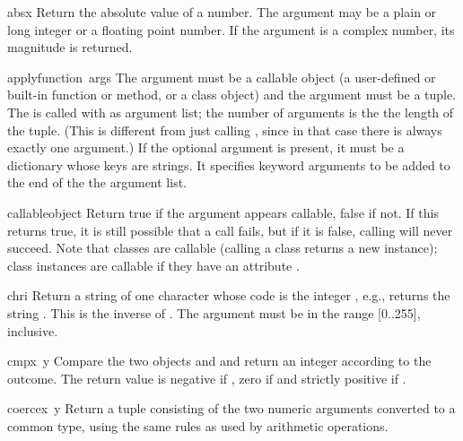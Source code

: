 \begin{funcdesc}{abs}{x}
  Return the absolute value of a number.  The argument may be a plain
  or long integer or a floating point number.  If the argument is a
  complex number, its magnitude is returned.
\end{funcdesc}

\begin{funcdesc}{apply}{function\, args}
The  argument must be a callable object (a user-defined or
built-in function or method, or a class object) and the 
argument must be a tuple.  The  is called with
 as argument list; the number of arguments is the the length
of the tuple.  (This is different from just calling
, since in that case there is always
exactly one argument.)
If the optional  argument is present, it must be a
dictionary whose keys are strings.  It specifies keyword arguments to
be added to the end of the the argument list.
\end{funcdesc}

\begin{funcdesc}{callable}{object}
Return true if the  argument appears callable, false if
not.  If this returns true, it is still possible that a call fails,
but if it is false, calling  will never succeed.  Note
that classes are callable (calling a class returns a new instance);
class instances are callable if they have an attribute .
\end{funcdesc}

\begin{funcdesc}{chr}{i}
  Return a string of one character whose \ASCII{} code is the integer
  , e.g.,  returns the string .  This is the
  inverse of .  The argument must be in the range [0..255],
  inclusive.
\end{funcdesc}

\begin{funcdesc}{cmp}{x\, y}
  Compare the two objects  and  and return an integer
  according to the outcome.  The return value is negative if , zero if  and strictly positive if
  .
\end{funcdesc}

\begin{funcdesc}{coerce}{x\, y}
  Return a tuple consisting of the two numeric arguments converted to
  a common type, using the same rules as used by arithmetic
  operations.
\end{funcdesc}

